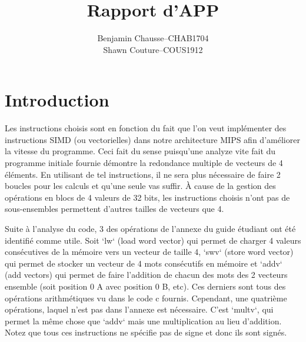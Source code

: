 \documentclass[a11paper]{article}
\title{Rapport d'APP}
\author{
  \addtolength{\tabcolsep}{-0.4em}
  \begin{tabular}{rcl} %
      Benjamin Chausse & -- & CHAB1704 \\
      Shawn Couture    & -- & COUS1912 \\
  \end{tabular}
}
\begin{document}
\maketitle
\newpage

\section{Introduction}
Les instructions choisis sont en fonction du fait que l'on veut implémenter des instructions SIMD (ou vectorielles) dans notre architecture MIPS afin d'améliorer
la vitesse du programme. Ceci fait du sense puisqu'une analyze vite fait du programme initiale fournie démontre la redondance multiple de vecteurs de 4 éléments.
En utilisant de tel instructions, il ne sera plus nécessaire de faire 2 boucles pour les calculs et qu'une seule vas suffir. À cause de la gestion des opérations en blocs de 4 valeurs de 32 bits, les instructions choisis n'ont pas de sous-ensembles permettent d'autres tailles de vecteurs que 4.

Suite à l'analyse du code, 3 des opérations de l'annexe du guide étudiant ont été identifié comme utile. Soit `lw` (load word vector) qui permet de charger 4 valeurs consécutives de la mémoire vers un vecteur de taille 4, `swv` (store word vector) qui permet de stocker un vecteur de 4 mots consécutifs en mémoire et `addv` (add vectors) qui permet de faire l'addition de chacun des mots des 2 vecteurs ensemble (soit position 0 A avec position 0 B, etc). Ces derniers sont tous des opérations arithmétiques vu dans le code c fournis. Cependant, une quatrième opérations, laquel n'est pas dans l'annexe est nécessaire. C'est `multv`, qui permet la même chose que `addv` mais une multiplication au lieu d'addition. Notez que tous ces instructions ne spécifie pas de signe et donc ils sont signés.
\end{document}
